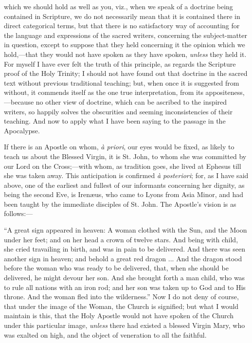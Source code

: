 which we should hold as well as you, viz., when we speak of a doctrine
being contained in Scripture, we do not necessarily mean that it is
contained there in direct categorical terms, but that there is no
satisfactory way of accounting for the language and expressions of the
sacred writers, concerning the subject-matter in question, except to
suppose that they held concerning it the opinion which we hold,—that
they would not have spoken as they have spoken, \emph{unless} they held
it. For myself I have ever felt the truth of this principle, as regards
the Scripture proof of the Holy Trinity; I should not have found out
that doctrine in the sacred text without previous traditional teaching;
but, when once it is suggested from without, it commends itself as the
one true interpretation, from its appositeness,—because no other view
of doctrine, which can be ascribed to the inspired writers, so happily
solves the obscurities and seeming inconsistencies of their teaching.
And now to apply what I have been saying to the passage in the
Apocalypse.

If there is an Apostle on whom, \emph{à priori}, our eyes would be
fixed, as likely to teach us about the Blessed Virgin, it is St. John,
to whom she was committed by our Lord on the Cross;—with whom, as
tradition goes, she lived at Ephesus till she was taken away. This
anticipation is confirmed \emph{à posteriori}; for, as I have said
above, one of the earliest and fullest of our informants concerning her
dignity, as being the second Eve, is Irenæus, who came to Lyons from
Asia Minor, and had been taught by the immediate disciples of St. John.
The Apostle's vision is as follows:—

``A great sign appeared in heaven: A woman clothed with the Sun,
and the Moon under her feet; and on her head a crown of twelve stars.
And being with child, she cried travailing in birth, and was in
pain to be delivered. And there was seen another sign in heaven; and
behold a great red dragon ... And the dragon stood before the woman who
was ready to be delivered, that, when she should be delivered, he might
devour her son. And she brought forth a man child, who was to rule all
nations with an iron rod; and her son was taken up to God and to His
throne. And the woman fled into the wilderness.'' Now I do not deny
of course, that under the image of the Woman, the Church is signified;
but what I would maintain is this, that the Holy Apostle would not have
spoken of the Church under this particular image, \emph{unless} there
had existed a blessed Virgin Mary, who was exalted on high, and the
object of veneration to all the faithful.

